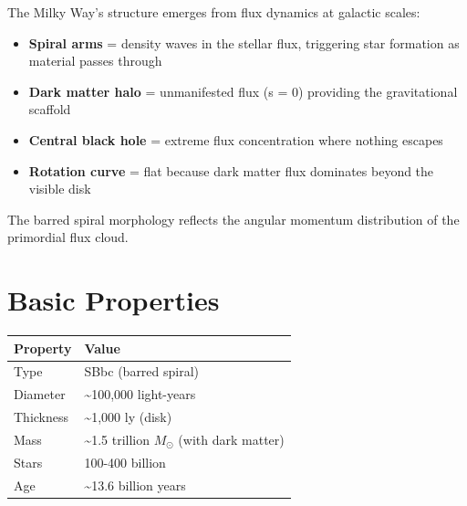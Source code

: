 \documentclass[
  11pt,
  letterpaper,
  twoside,
  openright]{book}
\providecommand{\tightlist}{%
  \setlength{\itemsep}{0pt}\setlength{\parskip}{0pt}}
\begin{document}
\begin{tcolorbox}[enhanced jigsaw, leftrule=.75mm, title=\textcolor{quarto-callout-note-color}{\faInfo}\hspace{0.5em}{How FTD Produces Galactic Structure}, bottomrule=.15mm, opacityback=0, coltitle=black, arc=.35mm, colframe=quarto-callout-note-color-frame, colbacktitle=quarto-callout-note-color!10!white, colback=white, titlerule=0mm, breakable, bottomtitle=1mm, toptitle=1mm, rightrule=.15mm, toprule=.15mm, left=2mm, opacitybacktitle=0.6]

The Milky Way's structure emerges from flux dynamics at galactic scales:

\begin{itemize}
\tightlist
\item
  \textbf{Spiral arms} = density waves in the stellar flux, triggering
  star formation as material passes through
\item
  \textbf{Dark matter halo} = unmanifested flux (s = 0) providing the
  gravitational scaffold
\item
  \textbf{Central black hole} = extreme flux concentration where nothing
  escapes
\item
  \textbf{Rotation curve} = flat because dark matter flux dominates
  beyond the visible disk
\end{itemize}

The barred spiral morphology reflects the angular momentum distribution
of the primordial flux cloud.

\end{tcolorbox}

\section{Basic Properties}\label{basic-properties}

\begin{longtable}[]{@{}ll@{}}
\toprule\noalign{}
Property & Value \\
\midrule\noalign{}
\endhead
\bottomrule\noalign{}
\endlastfoot
Type & SBbc (barred spiral) \\
Diameter & \textasciitilde100,000 light-years \\
Thickness & \textasciitilde1,000 ly (disk) \\
Mass & \textasciitilde1.5 trillion \(M_\odot\) (with dark matter) \\
Stars & 100-400 billion \\
Age & \textasciitilde13.6 billion years \\
\end{longtable}
\end{document}
